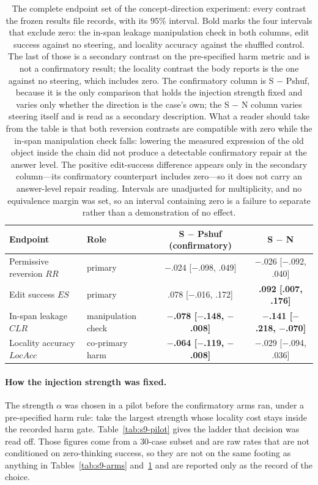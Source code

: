 \documentclass[letterpaper]{article}
\begin{document}
\begin{table}[t]
\centering
\small
\begin{tabular}{@{}llcc@{}}
\toprule
Endpoint & Role & S \(-\) Pshuf (confirmatory) & S \(-\) N \\
\midrule
Permissive reversion \(RR\)  & primary            & $-$.024 [$-$.098, .049] & $-$.026 [$-$.092, .040] \\
Edit success \(ES\)          & primary            & .078 [$-$.016, .172]    & \textbf{.092 [.007, .176]} \\
In-span leakage \(CLR\)      & manipulation check & \textbf{$-$.078 [$-$.148, $-$.008]} & \textbf{$-$.141 [$-$.218, $-$.070]} \\
Locality accuracy \(LocAcc\) & co-primary harm    & \textbf{$-$.064 [$-$.119, $-$.008]} & $-$.029 [$-$.094, .036] \\
\bottomrule
\end{tabular}
\caption{The complete endpoint set of the concept-direction experiment: every
contrast the frozen results file records, with its \(95\%\) interval.  Bold
marks the four intervals that exclude zero: the in-span leakage manipulation
check in both columns, edit success against no steering, and locality accuracy
against the shuffled control.  The last of those is a secondary contrast on the
pre-specified harm metric and is not a confirmatory result; the locality contrast
the body reports is the one against no steering, which includes zero.  The
confirmatory column is S \(-\) Pshuf, because it is the only
comparison that holds the injection strength fixed and varies only whether the
direction is the case's own; the S \(-\) N column varies steering itself and is
read as a secondary description.  What a reader should take from the table is
that both reversion contrasts are compatible with zero while the in-span
manipulation check falls: lowering the measured expression of the old object
inside the chain did not produce a detectable confirmatory repair at the answer
level.  The positive edit-success difference appears only in the secondary
column---its confirmatory counterpart includes zero---so it does not carry an
answer-level repair reading.  Intervals are unadjusted for multiplicity, and no
equivalence margin was set, so an interval containing zero is a failure to
separate rather than a demonstration of no effect.}
\label{tab:s9-contrasts}
\end{table}

\paragraph{How the injection strength was fixed.}
The strength \(\alpha\) was chosen in a pilot before the confirmatory arms ran,
under a pre-specified harm rule: take the largest strength whose locality cost
stays inside the recorded harm gate.  Table~\ref{tab:s9-pilot} gives the ladder
that decision was read off.  Those figures come from a \(30\)-case subset and are
raw rates that are not conditioned on zero-thinking success, so they are not on
the same footing as anything in Tables~\ref{tab:s9-arms}
and~\ref{tab:s9-contrasts} and are reported only as the record of the choice.
\end{document}
